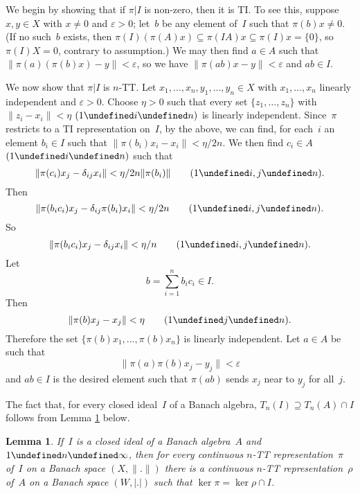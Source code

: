 \documentclass[11pt]{article}
\newcounter{arbenum}
\newenvironment{arbenumerate}{\begin{list}{{\rm(\arabic{arbenum})}}%
{\usecounter{arbenum}}}{\end{list}}
\newcommand{\sseq}{\subseteq}
\let\leq\undefined  \let\geq\undefined
\let\le\leq   \let\ge\geq
\newcommand{\e}{\varepsilon}
\newtheorem{lemma}[thm]{Lemma}
\newenvironment{Proof}{{\it Proof. }}{}%
\newcommand{\nnY}[1]{|#1|}
\begin{document}
\begin{Proof}
\begin{arbenumerate}
We begin by showing that if $\pi|I$ is non-zero, then it is TI.  To see this,
suppose $x,y \in X$ with $x \neq 0$ and $\e>0$; let~$b$ be any element of~$I$
such that $\pi(b)x \neq 0$.  (If no such~$b$ exists, then $\pi(I)(\pi(A)x) \sseq
\pi(IA)x \sseq \pi(I)x = \{0\}$, so $\pi(I)X = 0$, contrary to assumption.)   We
may then find $a \in A$ such that $\|\pi(a)(\pi(b)x) - y\| < \e$, so we have
$\|\pi(ab)x - y\| < \e$ and $ab \in I$.

We now show that $\pi|I$ is $n$-TT.  Let
$x_1,\dots,x_n, y_1,\dots,y_n \in X$ with $x_1,\dots,x_n$ linearly independent
and $\e > 0$.  Choose $\eta > 0$ such that every set $\{z_1,\dots,z_n\}$ with
$\|z_i - x_i\| < \eta$ $(1 \le i \le n)$ is linearly independent.  Since~$\pi$
restricts to a TI representation on~$I$, by the above, we can find, for each~$i$
an element $b_i \in I$ such that $\|\pi(b_i)x_i - x_i\| < \eta/2n$.    We then
find $c_i \in A$ $(1 \le i \le n)$ such that
$$\|\pi(c_i)x_j - \delta_{ij}x_i\| < \eta/2n\|\pi(b_i)\| \qquad (1 \le i,j \le n).$$
Then
$$\|\pi(b_ic_i)x_j - \delta_{ij}\pi(b_i)x_i\| < \eta/2n \qquad (1 \le i,j \le n).$$
So
$$\|\pi(b_ic_i)x_j - \delta_{ij}x_i\| < \eta/n \qquad (1 \le i,j \le n).$$
Let
$$b = \sum_{i=1}^n b_ic_i \in I.$$
Then
$$\|\pi(b)x_j - x_j\| < \eta \qquad (1 \le j \le n).$$
Therefore the set $\{\pi(b)x_1,\dots,\pi(b)x_n\}$ is linearly independent.
Let $a \in A$ be such that
$$\|\pi(a)\pi(b)x_j - y_j\| < \e$$
and $ab \in I$ is the desired element such that $\pi(ab)$ sends $x_j$ near to
$y_j$ for all~$j$.
\item The fact that, for every closed ideal~$I$ of a Banach algebra, $T_n(I)
\supseteq T_n(A) \cap I$ follows from Lemma \ref{L1} below.
\end{arbenumerate}
\end{Proof}

\begin{lemma}\label{L1}
If~$I$ is a closed ideal of a Banach algebra~$A$ and $1 \le n \le \infty$,
then for every continuous $n$-TT representation~$\pi$ of~$I$ on a Banach space
$(X,\|.\|)$ there is a continuous $n$-TT representation~$\rho$ of~$A$ on a
Banach space $(W,\nnY{.})$ such that $\ker\pi = \ker\rho \cap I$.
\end{lemma}
\end{document}
